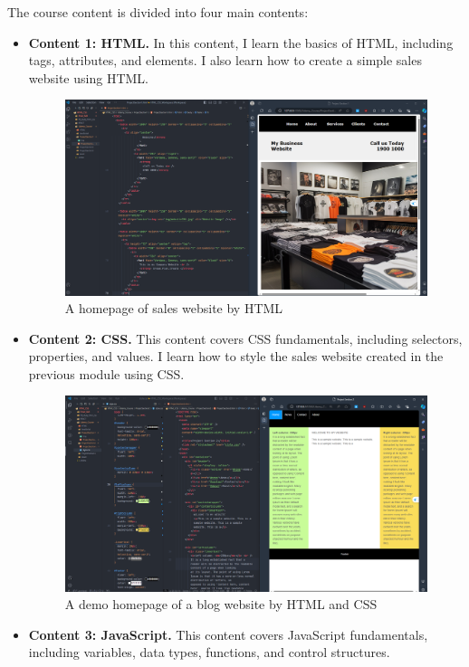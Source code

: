 The course content is divided into four main contents:
\begin{itemize}
	\item \textbf{Content 1: HTML.} In this content, I learn the basics of HTML, including tags, attributes, and elements. I also learn how to create a simple sales website using HTML.
	      \begin{figure}[H]
		      \centering
		      \includegraphics[width=1\linewidth]{img/Capture08.PNG}
		      \caption{A homepage of sales website by HTML}
	      \end{figure}
	\item \textbf{Content 2: CSS.} This content covers CSS fundamentals, including selectors, properties, and values. I learn how to style the sales website created in the previous module using CSS.
	      \begin{figure}[H]
		      \centering
		      \includegraphics[width=0.9\linewidth]{img/Capture09.PNG}
		      \caption{A demo homepage of a blog website by HTML and CSS}
	      \end{figure}
	\item \textbf{Content 3: JavaScript.} This content covers JavaScript fundamentals, including variables, data types, functions, and control structures.

\end{itemize}
